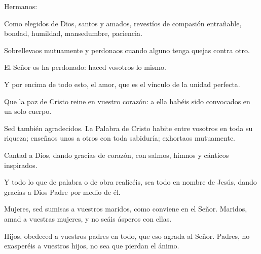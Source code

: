 		
		 
		
		
		\begin{scripture}
			Hermanos:
			
			Como elegidos de Dios, santos y amados, revestíos de compasión entrañable, bondad, humildad, mansedumbre, paciencia.
			
			Sobrellevaos mutuamente y perdonaos cuando alguno tenga quejas contra otro.
			
			El Señor os ha perdonado: haced vosotros lo mismo.
			
			Y por encima de todo esto, el amor, que es el vínculo de la unidad perfecta.
			
			Que la paz de Cristo reine en vuestro corazón: a ella habéis sido convocados en un solo cuerpo.
			
			Sed también agradecidos. La Palabra de Cristo habite entre vosotros en toda su riqueza; enseñaos unos a otros con toda sabiduría; exhortaos mutuamente.
			
			Cantad a Dios, dando gracias de corazón, con salmos, himnos y cánticos inspirados.
			
			Y todo lo que de palabra o de obra realicéis, sea todo en nombre de Jesús, dando gracias a Dios Padre por medio de él.
			
			Mujeres, sed sumisas a vuestros maridos, como conviene en el Señor. Maridos, amad a vuestras mujeres, y no seáis ásperos con ellas.
			
			Hijos, obedeced a vuestros padres en todo, que eso agrada al Señor. Padres, no exasperéis a vuestros hijos, no sea que pierdan el ánimo.
		\end{scripture}

		
		 
		
		
